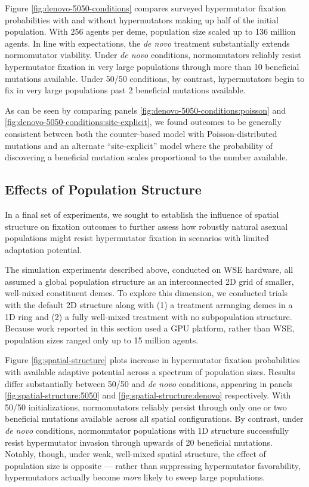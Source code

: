 Figure \ref{fig:denovo-5050-conditions} compares surveyed hypermutator fixation probabilities with and without hypermutators making up half of the initial population.
With 256 agents per deme, population size scaled up to 136 million agents.
In line with expectations, the \textit{de novo} treatment substantially extends normomutator viability.
Under \textit{de novo} conditions, normomutators reliably resist hypermutator fixation in very large populations through more than 10 beneficial mutations available.
Under 50/50 conditions, by contrast, hypermutators begin to fix in very large populations past 2 beneficial mutations available.

As can be seen by comparing panels \ref{fig:denovo-5050-conditions:poisson} and \ref{fig:denovo-5050-conditions:site-explicit}, we found outcomes to be generally consistent between both the counter-based model with Poisson-distributed mutations and an alternate ``site-explicit'' model where the probability of discovering a beneficial mutation scales proportional to the number available.

\subsection{Effects of Population Structure}
\label{sec:population-structure}

In a final set of experiments, we sought to establish the influence of spatial structure on fixation outcomes to further assess how robustly natural asexual populations might resist hypermutator fixation in scenarios with limited adaptation potential.

The simulation experiments described above, conducted on WSE hardware, all assumed a global population structure as an interconnected 2D grid of smaller, well-mixed constituent demes.
To explore this dimension, we conducted trials with the default 2D structure along with (1) a treatment arranging demes in a 1D ring and (2) a fully well-mixed treatment with no subpopulation structure.
Because work reported in this section used a GPU platform, rather than WSE, population sizes ranged only up to 15 million agents.



Figure \ref{fig:spatial-structure} plots increase in hypermutator fixation probabilities with available adaptive potential across a spectrum of population sizes.
Results differ substantially between 50/50 and \textit{de novo} conditions, appearing in panels \ref{fig:spatial-structure:5050} and \ref{fig:spatial-structure:denovo} respectively.
With 50/50 initializations, normomutators reliably persist through only one or two beneficial mutations available across all spatial configurations.
By contrast, under \textit{de novo} conditions, normomutator populations with 1D structure successfully resist hypermutator invasion through upwards of 20 beneficial mutations.
Notably, though, under weak, well-mixed spatial structure, the effect of population size is opposite --- rather than suppressing hypermutator favorability, hypermutators actually become \textit{more} likely to sweep large populations.

